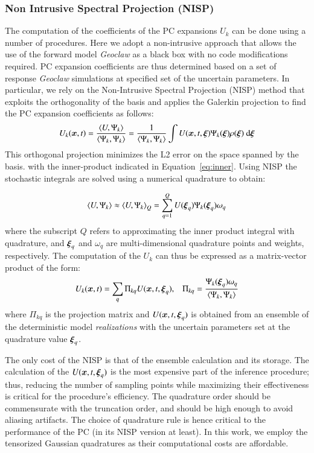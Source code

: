 \subsubsection{Non Intrusive Spectral Projection (NISP)}
The computation of the coefficients of the PC expansions $U_k$
can be done using a number of procedures. Here we adopt a non-intrusive
approach that allows the use of the forward model \emph{Geoclaw} as a black box
with no code modifications required. PC expansion coefficients are thus determined
based on a set of response \emph{Geoclaw} simulations at specified set of the uncertain parameters. 
In particular, we rely on the Non-Intrusive Spectral Projection (NISP) method that exploits the orthogonality of the basis and applies the Galerkin projection to find the PC expansion coefficients as follows:
\begin{equation}
 U_k(\bm{x},t) = \frac{\left< U, \Psi_k \right>}{\left< \Psi_k, \Psi_k \right>} = 
 \frac{1}{\left< \Psi_k, \Psi_k \right>} 
 \int U(\bm{x},t,\xxi) \Psi_k(\xxi) \rho(\xxi) \mbox{ d}\xxi
\end{equation}
This orthogonal projection minimizes the L2 error on the space spanned by the basis.
with the inner-product indicated in Equation~\ref{eq:inner}.
Using NISP the stochastic integrals are solved using a numerical quadrature to obtain:

\begin{equation}
  \left< U, \Psi_k \right> 
\approx \left< U, \Psi_k \right>_Q
= \sum_{q=1}^Q U(\xxi_q) \Psi_k(\xxi_q) \omega_q
\end{equation}
where the subscript $Q$ refers to approximating the inner product integral with
quadrature, and $\xxi_q$ and $\omega_q$ are multi-dimensional quadrature points and weights,
respectively.
The computation of the ${U}_k$ can thus be expressed as a matrix-vector product of the form:
\begin{equation} 
 U_k(\bm{x},t)=\sum_q \Pi_{kq} U(\bm{x},t,\xxi_q),\;\;\;
 \Pi_{kq}=\frac{\Psi_k(\xxi_q)\omega_q}{\left< \Psi_k, \Psi_k \right>}
\end{equation} 
where $\Pi_{kq}$ is the projection matrix and $U(\bm{x},t,\xxi_q)$ is obtained
from an ensemble of the deterministic model {\em realizations} with the uncertain parameters set at
the quadrature value $\xxi_q$. 

The only cost of the NISP is that of the ensemble calculation and its storage.
The calculation of the $U(\bm{x},t,\xxi_q)$ is the most expensive part of the
inference procedure; thus, reducing the number of sampling points
while maximizing their effectiveness is critical for the procedure's
efficiency.  The quadrature order should be commensurate with the
truncation order, and should be high enough to avoid aliasing artifacts.
The choice of quadrature rule is hence critical to the performance
of the PC (in its NISP version at least). In this work, we employ the 
tensorized Gaussian quadratures as their computational costs are affordable.

